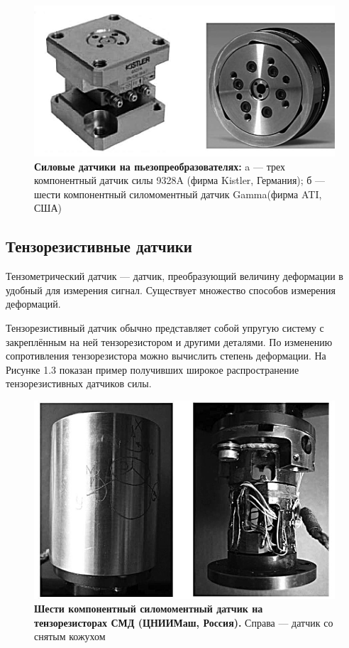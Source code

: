 \documentclass[a4paper,14pt,russian]{extreport} \usepackage{extsizes}
\begin{document}
	\begin{figure}[ht]
		\centering		 
		\includegraphics[width=6in]{./img/img12.jpg}	
		\caption{
			\textbf{Силовые датчики на пьезопреобразователях: }			
				a — трех компонентный датчик силы 9328A (фирма Kistler, Германия); б — шести компонентный силомоментный датчик Gamma(фирма ATI, США)
		}     
		\label{fig_img12}
	\end{figure}
	\subsection {Тензорезистивные датчики}
	Тензометрический датчик — датчик, преобразующий величину деформации в удобный для измерения сигнал. Существует множество способов измерения деформаций.
	
	Тензорезистивный датчик обычно представляет собой упругую систему с закреплённым на ней тензорезистором и другими деталями. По изменению сопротивления тензорезистора можно вычислить степень деформации. На Рисунке 1.3 показан пример получивших широкое распространение тензорезистивных датчиков силы.	
	\begin{figure}[ht]
		\centering		 
		\includegraphics[width=6in]{./img/img13.jpg}	
		\caption{
			\textbf{Шести компонентный силомоментный датчик
				на тензорезисторах СМД (ЦНИИМаш, Россия).}
				Справа — датчик со снятым кожухом
		}     
		\label{fig_img13}
	\end{figure}
\end{document}
